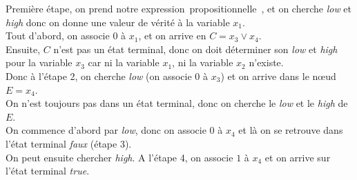 \documentclass[a4paper, oneside]{report}
\newcommand{\expp}{expression~propositionnelle~}
\begin{document}
Première étape, on prend notre \expp, et on cherche \textit{low} et \textit{high} donc on donne une valeur de vérité à la variable $x_1$.\\
Tout d'abord, on associe $0$ à $x_1$, et on arrive en $C = x_3 \vee x_4  $.\\
Ensuite, $C$ n'est pas un état terminal, donc on doit déterminer son \textit{low} et \textit{high} pour la variable $x_3$ car ni la variable $x_1$, ni la variable $x_2$ n'existe.\\
Donc à l'étape 2, on cherche \textit{low} (on associe $0$ à $x_3$) et on arrive dans le nœud $E = x_4$.\\
On n'est toujours pas dans un état terminal, donc on cherche le \textit{low} et le \textit{high} de $E$.\\
On commence d'abord par \textit{low}, donc on associe $0$ à $x_4$ et là on se retrouve dans l'état terminal \textit{faux} (étape 3).\\
On peut ensuite chercher \textit{high}. A l'étape 4, on associe $1$ à $x_4$ et on arrive sur l'état terminal \textit{true}.
\newpage
\end{document}
